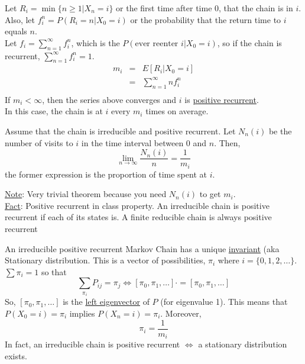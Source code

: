    \noindent Let $R_i = \min\{n \ge 1 | X_n = i\}$ or the first time after time 0, that
     the chain is in $i$.\\
     Also, let $f_i^n = P(R_i = n | X_0 = i)$ or the probability that the return time
     to $i$ equals $n$.\\
     Let $f_i = \sum_{n = 1}^{\infty} f_i^n$, which is the $P(\text{ever reenter $i$} |
     X_0 = i)$, so if the chain is recurrent, $\sum_{n = 1}^{\infty}f_i^n = 1$.\\
     \begin{eqnarray*}
      m_i & = & E[R_i | X_0 = i]\\
        & = & \sum_{n = 1}^{\infty} nf_i^n\\
     \end{eqnarray*}
     If $m_i < \infty$, then the series above converges and $i$ is 
     \underline{positive recurrent}.\\
     In this case, the chain is at $i$ every $m_i$ times on average.\\
    \begin{theorem}
      Assume that the chain is irreducible and positive recurrent. Let
      $N_n(i)$ be the number of visits to $i$ in the time interval between
      0 and $n$. Then,
      $$
        \lim_{n \to \infty} \frac{N_n(i)}{n} = \frac{1}{m_i}
      $$
      the former expression is the proportion of time spent at $i$.\\
    \end{theorem}
    \underline{Note}: Very trivial theorem because you need $N_n(i)$ to get
    $m_i$.\\
    \underline{Fact}: Positive recurrent in class property. An irreducible
    chain is positive recurrent if each of its states is. A finite reducible
    chain is always positive recurrent\\
    \begin{theorem}
      An irreducible positive recurrent Markov Chain has a unique 
       \underline{invariant} (aka Stationary distribution. This is a vector
       of possibilities, $\pi_i$ where $i = \{0, 1, 2, \ldots\}$.\\
       $\sum \pi_i = 1$ so that
       $$
        \sum_{\pi_i}P_{ij} = \pi_j \Leftrightarrow [\pi_0, \pi_1, \ldots]
        \cdot = [\pi_0, \pi_1, \ldots]
       $$
       So, $[\pi_0, \pi_1, \ldots]$ is the \underline{left eigenvector} of
       $P$ (for eigenvalue 1). This means that $P(X_0 = i) = \pi_i$ implies
       $P(X_n = i) = \pi_i$. Moreover,
       $$
        \pi_i = \frac{1}{m_i}
       $$
       In fact, an irreducible chain is positive recurrent $\Leftrightarrow$
       a stationary distribution exists.
    \end{theorem}
